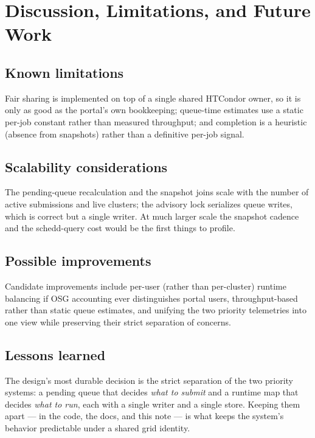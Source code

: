\section{Discussion, Limitations, and Future Work}\label{ch:17}

\subsection{Known limitations}

Fair sharing is implemented on top of a single shared HTCondor owner, so it is only as good as the portal's own
bookkeeping; queue-time estimates use a static per-job constant rather than measured throughput; and completion
is a heuristic (absence from snapshots) rather than a definitive per-job signal.

\subsection{Scalability considerations}

The pending-queue recalculation and the snapshot joins scale with the number of active submissions and live
clusters; the advisory lock serializes queue writes, which is correct but a single writer. At much larger scale
the snapshot cadence and the schedd-query cost would be the first things to profile.

\subsection{Possible improvements}

Candidate improvements include per-user (rather than per-cluster) runtime balancing if OSG accounting ever
distinguishes portal users, throughput-based rather than static queue estimates, and unifying the two priority
telemetries into one view while preserving their strict separation of concerns.

\subsection{Lessons learned}

The design's most durable decision is the strict separation of the two priority systems: a pending queue that
decides \textit{what to submit} and a runtime map that decides \textit{what to run}, each with a single writer
and a single store. Keeping them apart --- in the code, the docs, and this note --- is what keeps the system's
behavior predictable under a shared grid identity.
